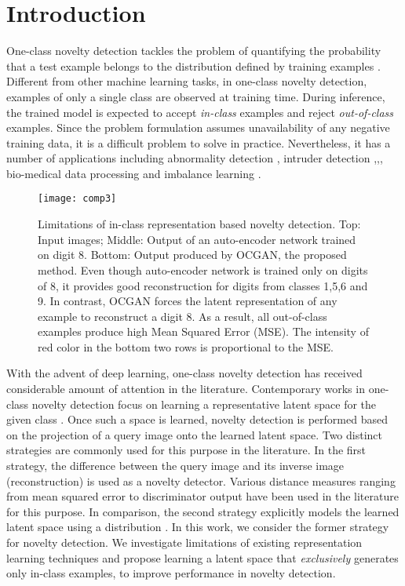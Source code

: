 \documentclass[10pt,twocolumn,letterpaper]{article}
\begin{document}
\section{Introduction}


One-class novelty detection tackles the problem of quantifying the probability that a test example belongs to the distribution defined by training examples \cite{dsvdd}. Different from other machine learning tasks, in one-class novelty detection, examples of only a single class are observed at training time. During inference, the trained model is expected to accept \textit{in-class} examples and reject \textit{out-of-class} examples. Since the problem formulation assumes unavailability of any negative training data, it is a difficult problem to solve in practice. Nevertheless, it has a number of applications including abnormality detection \cite{Saleh:2013:OAD:2514950.2516141},\cite{oza2019one} intruder detection \cite{ocfeatures},\cite{oza2019active},\cite{btasoc}, bio-medical data processing \cite{roberts} and imbalance learning \cite{Napierala2016}.



\begin{figure}
    \centering
\texttt{[image: comp3]}\hskip30pt
    \caption{Limitations of in-class representation based novelty detection. Top: Input images; Middle: Output of an auto-encoder network trained on digit 8. Bottom: Output produced by OCGAN, the proposed method. Even though auto-encoder network is trained only on digits of 8, it provides good reconstruction for digits from classes 1,5,6 and 9. In contrast, OCGAN forces the latent representation of any example to reconstruct a digit 8. As a result, all out-of-class examples produce high Mean Squared Error (MSE). The intensity of red color in the bottom two rows is proportional to the MSE.}
    \label{fig:comp}
\end{figure}

With the advent of deep learning, one-class novelty detection has received considerable amount of attention in the literature. Contemporary works in one-class novelty detection focus on learning a representative latent space for the given class  \cite{AE,GPND}. Once such a space is learned, novelty detection is performed based on the projection of a query image onto the learned latent space. Two distinct strategies are commonly used for this purpose in the literature. In the first strategy, the difference between the query image and its inverse image (reconstruction) is used as a novelty detector. Various distance measures ranging from mean squared error \cite{AE} to discriminator output \cite{cvpr2018} have been used in the literature for this purpose. In comparison, the second strategy explicitly models the learned latent space using a distribution \cite{AND,GPND,dsvdd,btasoc}. In this work, we consider the former strategy for novelty detection. We investigate limitations of existing representation learning techniques and propose learning a latent space that {\it exclusively} generates only in-class examples, to improve performance in novelty detection. 
\end{document}
